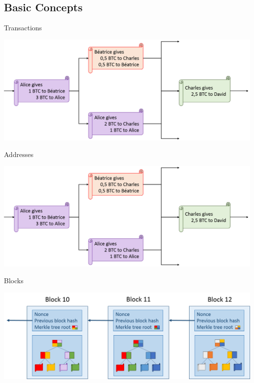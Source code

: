 %
\subsection{Basic Concepts}


\begin{frame}{Transactions}
    \begin{center}
        \includegraphics[scale=0.36]{Figures/tx.png}
    \end{center}
\end{frame}

\begin{frame}{Addresses}
    \begin{center}
        \includegraphics[scale=0.36]{Figures/tx.png}
    \end{center}
\end{frame}

\begin{frame}{Blocks}
    \begin{center}
        \includegraphics[scale=0.36]{Figures/blocks.png}
    \end{center}
\end{frame}


